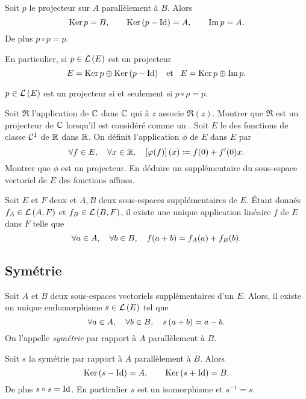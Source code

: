 \documentclass{magnolia}
\begin{document}
\begin{proposition}[utile=1]
Soit $p$ le projecteur sur $A$ parallèlement à $B$. Alors
\[\mathop{\rm Ker} p=B, \qquad \mathop{\rm Ker}\left(p-\operatorname{Id}\right)=A, \qquad \operatorname{Im} p=A.\]
De plus $p\circ p=p$.
\end{proposition}

\begin{remarqueUnique}
\remarque[utile=1] En particulier, si $p\in\mathcal{L}\left(E\right)$ est un projecteur
  \[E=\mathop{\rm Ker} p\oplus\mathop{\rm Ker}\left(p-\operatorname{Id}\right) \quad\!\text{et}\quad\! E=\mathop{\rm Ker} p\oplus\operatorname{Im} p.\]
\end{remarqueUnique}

\begin{proposition}[utile=3]
$p\in\mathcal{L}\left(E\right)$ est un projecteur si et seulement si $p\circ p=p$.  
\end{proposition}

\begin{exos}
\exo Soit $\Re$ l'application de $\mathbb{C}$ dans $\mathbb{C}$ qui à $z$ associe
  $\Re(z)$. Montrer que $\Re$ est un projecteur de $\mathbb{C}$ lorsqu'il est considéré
  comme un \Rev.
\exo Soit $E$ le \Rev des fonctions de classe $\mathcal{C}^{1}$ de $\mathbb{R}$ dans
  $\mathbb{R}$. On définit l'application $\phi$ de $E$ dans $E$ par
  \[\forall f\in E ,\quad \forall x\in\mathbb{R} ,\quad \left[\varphi(f)\right](x)\coloneqq f(0)+f'(0)x.\]
  Montrer que $\phi$ est un projecteur. En déduire un supplémentaire du
  sous-espace vectoriel de $E$ des fonctions affines.
\end{exos}

\begin{proposition}[utile=1]
Soit $E$ et $F$ deux \Kevs et $A,B$ deux sous-espaces supplémentaires de $E$.
Étant donnés $f_A\in\mathcal{L}\left(A,F\right)$ et $f_B\in\mathcal{L}\left(B,F\right)$, il existe une unique
application linéaire $f$ de $E$ dans $F$ telle que
\[\forall a\in A ,\quad \forall b\in B ,\quad f(a+b)=f_A(a)+f_B(b).\]
\end{proposition}

\subsection{Symétrie}

\begin{definition}[utile=-3]
Soit $A$ et $B$ deux sous-espaces vectoriels supplémentaires d'un \Kev $E$.
Alors, il existe un unique endomorphisme $s\in\mathcal{L}\left(E\right)$ tel que
\[\forall a\in A ,\quad \forall b\in B ,\quad s\left(a+b\right)=a-b.\]
On l'appelle \emph{symétrie} par rapport à $A$ parallèlement à $B$.
\end{definition}

\begin{proposition}[utile=1]
Soit $s$ la symétrie par rapport à $A$ parallèlement à $B$. Alors
\[\mathop{\rm Ker} \left(s-\operatorname{Id}\right)=A, \qquad \mathop{\rm Ker}\left(s+\operatorname{Id}\right)=B.\]
De plus $s\circ s=\operatorname{Id}$. En particulier $s$ est un isomorphisme et $s^{-1}=s$.
\end{proposition}
\end{document}
